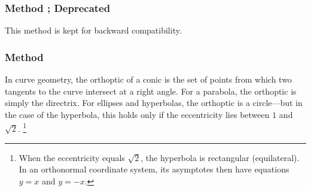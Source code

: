 \subsubsection{Method ; Deprecated}
\label{ssub:method_conic_in_out}

This method is kept for backward compatibility.


\subsubsection{Method }
\label{ssub:method_conic_orthoptic}

In curve geometry, the orthoptic of a conic is the set of points from which two tangents to the curve intersect at a right angle.
For a parabola, the orthoptic is simply the directrix.
For ellipses and hyperbolas, the orthoptic is a circle—but in the case of the hyperbola, this holds only if the eccentricity lies between \( 1 \) and \( \sqrt{2} \).
\footnote{When the eccentricity equals \( \sqrt{2} \), the hyperbola is rectangular (equilateral). In an orthonormal coordinate system, its asymptotes then have equations \( y = x \) and \( y = -x \).}

\vspace{1em}

